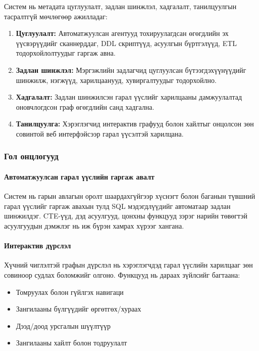 Систем нь метадата цуглуулалт, задлан шинжлэл, хадгалалт, танилцуулгын тасралтгүй мөчлөгөөр ажилладаг:

\begin{enumerate}
    \item \textbf{Цуглуулалт:} Автоматжуулсан агентууд тохируулагдсан өгөгдлийн эх үүсвэрүүдийг сканнерддаг, DDL скриптүүд, асуулгын бүртгэлүүд, ETL тодорхойлолтуудыг гаргаж авна.
    
    \item \textbf{Задлан шинжлэл:} Мэргэжлийн задлагчид цуглуулсан бүтээгдэхүүнүүдийг шинжилж, нэгжүүд, харилцаанууд, хувиргалтуудыг тодорхойлно.
    
    \item \textbf{Хадгалалт:} Задлан шинжилсэн гарал үүслийг харилцааны дамжуулалтад оновчлогдсон граф өгөгдлийн санд хадгална.
    
    \item \textbf{Танилцуулга:} Хэрэглэгчид интерактив графууд болон хайлтыг онцолсон зөн совинтой веб интерфэйсээр гарал үүсэлтэй харилцана.
\end{enumerate}

\subsubsection{Гол онцлогууд}

\paragraph{Автоматжуулсан гарал үүслийн гаргаж авалт}
Систем нь гарын авлагын оролт шаардахгүйгээр хүснэгт болон баганын түвшний гарал үүслийг гаргаж авахын тулд SQL мэдэгдлүүдийг автоматаар задлан шинжилдэг. CTE-үүд, дэд асуулгууд, цонхны функцууд зэрэг нарийн төвөгтэй асуулгуудын дэмжлэг нь иж бүрэн хамрах хүрээг хангана.

\paragraph{Интерактив дүрслэл}
Хүчний чиглэлтэй графын дүрслэл нь хэрэглэгчдэд гарал үүслийн харилцааг зөн совиноор судлах боломжийг олгоно. Функцууд нь дараах зүйлсийг багтаана:
\begin{itemize}
    \item Томруулах болон гүйлгэх навигаци
    \item Зангилааны бүлгүүдийг өргөтгөх/хураах
    \item Дээд/доод урсгалын шүүлтүүр
    \item Зангилааны хайлт болон тодруулалт
\end{itemize}

